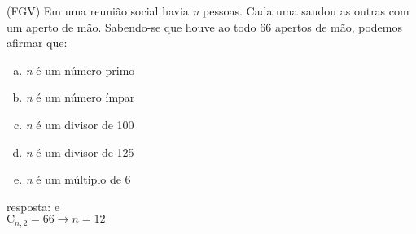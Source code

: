 \begin{ex}
(FGV) Em uma reunião social havia \textit{n} pessoas. Cada uma saudou as outras com um aperto de mão. Sabendo-se que houve ao todo 66 apertos de mão, podemos afirmar que:
   \begin{enumerate}[(a)]
   \item \textit{n} é um número primo
   \item \textit{n} é um número ímpar
   \item \textit{n} é um divisor de 100
   \item \textit{n} é um divisor de 125
   \item \textit{n} é um múltiplo de 6
   \end{enumerate}
     \begin{sol}
       resposta: e \\
       $\mathrm{C}_{n,2}=66 \longrightarrow n=12$
     \end{sol}
\end{ex}